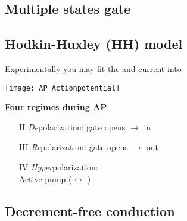 \subsection{Multiple states gate}
%

\subsection{Hodkin-Huxley \textnormal{(HH)} model}
%
Experimentally you may fit the  and  current into

\begin{minipage}{.35\columnwidth}
    \texttt{[image: AP\_Actionpotential]}
\end{minipage}%
\hspace{\boxmargin}%
\begin{minipage}{.65\columnwidth}
    \textbf{Four regimes during AP}:
    \begin{enumerate}
        \item[II] \textit{De}polarization:
         gate opens $\to$  in
        \item[III] \textit{Re}polarization:
         gate opens $\to$  out
        \item[IV] \textit{Hyper}polarization:\\
        Active  pump ($\leftrightarrow$ )
    \end{enumerate}
\end{minipage}%
\subsection{Decrement-free conduction}
